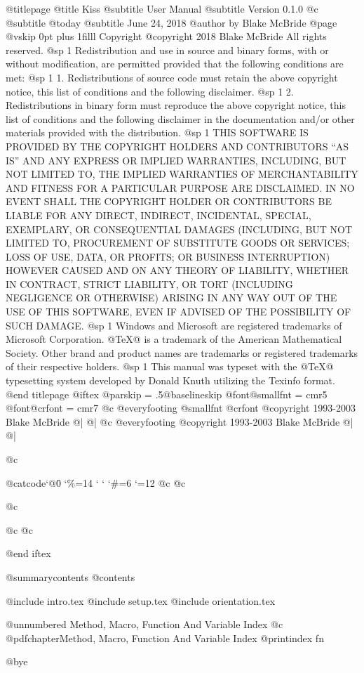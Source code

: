 @titlepage
@title Kiss
@subtitle User Manual
@subtitle Version 0.1.0
@c @subtitle @today{}
@subtitle June 24, 2018
@author by Blake McBride
@page
@vskip 0pt plus 1filll
Copyright  @copyright{} 2018 Blake McBride
All rights reserved.
@sp 1
Redistribution and use in source and binary forms, with or without
modification, are permitted provided that the following conditions are
met:
@sp 1
1. Redistributions of source code must retain the above copyright
notice, this list of conditions and the following disclaimer.
@sp 1
2. Redistributions in binary form must reproduce the above copyright
notice, this list of conditions and the following disclaimer in the
documentation and/or other materials provided with the distribution.
@sp 1
THIS SOFTWARE IS PROVIDED BY THE COPYRIGHT HOLDERS AND CONTRIBUTORS
``AS IS'' AND ANY EXPRESS OR IMPLIED WARRANTIES, INCLUDING, BUT NOT
LIMITED TO, THE IMPLIED WARRANTIES OF MERCHANTABILITY AND FITNESS FOR
A PARTICULAR PURPOSE ARE DISCLAIMED. IN NO EVENT SHALL THE COPYRIGHT
HOLDER OR CONTRIBUTORS BE LIABLE FOR ANY DIRECT, INDIRECT, INCIDENTAL,
SPECIAL, EXEMPLARY, OR CONSEQUENTIAL DAMAGES (INCLUDING, BUT NOT
LIMITED TO, PROCUREMENT OF SUBSTITUTE GOODS OR SERVICES; LOSS OF USE,
DATA, OR PROFITS; OR BUSINESS INTERRUPTION) HOWEVER CAUSED AND ON ANY
THEORY OF LIABILITY, WHETHER IN CONTRACT, STRICT LIABILITY, OR TORT
(INCLUDING NEGLIGENCE OR OTHERWISE) ARISING IN ANY WAY OUT OF THE USE
OF THIS SOFTWARE, EVEN IF ADVISED OF THE POSSIBILITY OF SUCH DAMAGE.
@sp 1
Windows and Microsoft are registered trademarks of
Microsoft Corporation.  @TeX{}@ is a trademark of the American
Mathematical Society. Other brand and product names are trademarks or
registered trademarks of their respective holders.
@sp 1
This manual was typeset with the @TeX{}@ typesetting system developed by
Donald Knuth utilizing the Texinfo format.
@end titlepage
@iftex
@parskip = .5@baselineskip
@font@smallfnt = cmr5
@font@crfont = cmr7
@c @everyfooting {@smallfnt {@crfont @copyright{}} 1993-2003 Blake McBride} @| @|
@c @everyfooting { @copyright{} 1993-2003 Blake McBride} @| @|


@c {@catcode`@\=0 \catcode`\%=14 \catcode` \catcode` \catcode `\#=6 \catcode `\@=12
@c 
@c 
@c 
@c %
@c }

@end iftex

@summarycontents
@contents

@include intro.tex
@include setup.tex
@include orientation.tex


@unnumbered Method, Macro, Function And Variable Index
@c @pdfchapter{Method, Macro, Function And Variable Index}
@printindex fn

@bye

